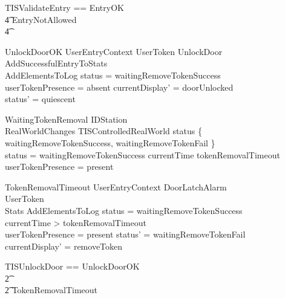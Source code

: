 \begin{zed}
        TISValidateEntry == EntryOK
\\ \t4          \lor EntryNotAllowed
\\ \t4          \lor [~ UserTokenTorn | status = waitingEntry ~] 
\end{zed}

\begin{schema}{UnlockDoorOK}
        UserEntryContext
\also
      \Xi UserToken
\also
        UnlockDoor
\\      AddSuccessfulEntryToStats
\\      AddElementsToLog
\where
        status = waitingRemoveTokenSuccess
\\      userTokenPresence = absent
\also
        currentDisplay' = doorUnlocked
\\      status' = quiescent
\end{schema}

\begin{schema}{WaitingTokenRemoval}
        \Xi IDStation
\\      RealWorldChanges
\also
        \Xi TISControlledRealWorld
\where
        status \in \{ waitingRemoveTokenSuccess, 
waitingRemoveTokenFail \}
\\      status = waitingRemoveTokenSuccess \implies currentTime \leq tokenRemovalTimeout 
\\      userTokenPresence = present
\end{schema}

\begin{schema}{TokenRemovalTimeout}
        UserEntryContext
\also
        \Xi DoorLatchAlarm
\\      \Xi UserToken
\\      \Xi Stats       
\also
        AddElementsToLog
\where
        status = waitingRemoveTokenSuccess
\\      currentTime > tokenRemovalTimeout 
\\      userTokenPresence = present
\also
        status' = waitingRemoveTokenFail
\\      currentDisplay' = removeToken
\end{schema}

\begin{zed}
        TISUnlockDoor == UnlockDoorOK 
\\      \t2 \lor [ WaitingTokenRemoval |status =
waitingRemoveTokenSuccess ]
\\      \t2 \lor TokenRemovalTimeout
\end{zed}

